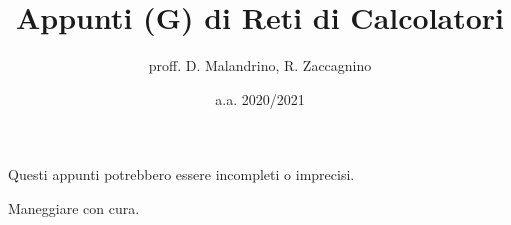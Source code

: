 \documentclass{article}
\title{Appunti (G) di Reti di Calcolatori}
\author{proff. D. Malandrino, R. Zaccagnino}
\date{a.a. 2020/2021}
\begin{document}
\maketitle

\begin{center}
    Questi appunti potrebbero essere incompleti o imprecisi.
    
    Maneggiare con cura.
\end{center}

\tableofcontents


















\end{document}
